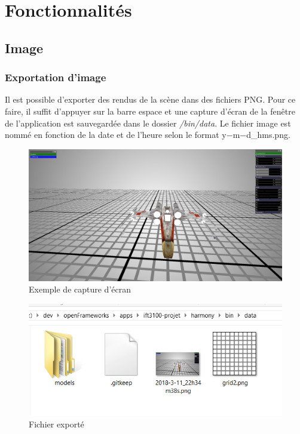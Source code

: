 \section{Fonctionnalités}
\label{s:fonctionnalités}

\subsection{Image}
\subsubsection{Exportation d'image}
Il est possible d'exporter des rendus de la scène dans des fichiers PNG.
Pour ce faire, il suffit d'appuyer sur la barre espace et une capture d'écran de la fenêtre de l'application est sauvegardée dans le dossier \textit{/bin/data}.
Le fichier image est nommé en fonction de la date et de l'heure selon le format y$-$m$-$d\_hms.png.

\begin{figure}[H]
    \centering
	\includegraphics[scale=0.1]{fig/2018-3-11_22h34m38s.png}
	\caption{Exemple de capture d'écran}
	\label{fig:capture_ecran}
\end{figure}

\begin{figure}[H]
    \centering
	\includegraphics[scale=0.5]{fig/preuve-capture.png}
	\caption{Fichier exporté}
	\label{fig:preuve-capture}
\end{figure}

